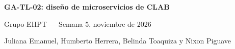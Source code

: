 \begin{center}
{\large\bfseries GA-TL-02: diseño de microservicios de CLAB}\par
Grupo EHPT --- Semana 5, noviembre de 2026\par
{\small Juliana Emanuel, Humberto Herrera, Belinda Toaquiza y Nixon Piguave}\par
\end{center}

